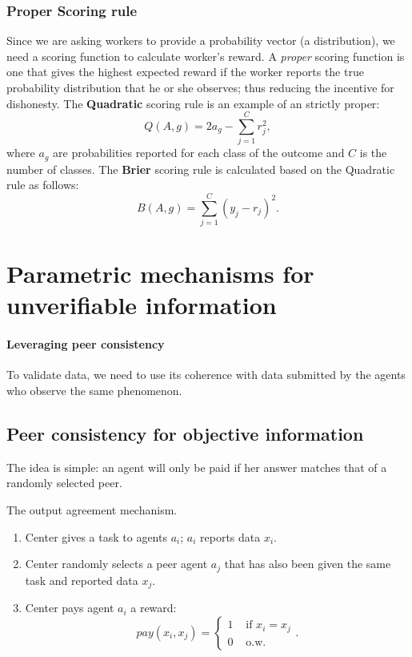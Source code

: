 \documentclass{report}
\theoremstyle{definition}
\begin{document}
\subsubsection{Proper Scoring rule}
Since we are asking workers to provide a probability vector (a distribution), we need a scoring function to calculate worker's reward. A \emph{proper} scoring function is one that gives the highest expected reward if the worker reports the true probability distribution that he or she observes; thus reducing the incentive for dishonesty. The \textbf{Quadratic} scoring rule is an example of an strictly proper:
\begin{equation}
    Q(A, g) = 2a_g - \sum^C_{j=1} {r_j^2}, 
\end{equation}
where $a_g$ are probabilities reported for each class of the outcome and $C$ is the number of classes. The \textbf{Brier} scoring rule is calculated based on the Quadratic rule as follows:
\begin{equation}
    B(A, g) = \sum_{j=1}^C (y_j -r_j)^2.
\end{equation}

\section{Parametric mechanisms for unverifiable information}

\paragraph{Leveraging peer consistency}
To validate data, we need to use its coherence with data submitted by the agents who observe the same phenomenon.

\subsection{Peer consistency for objective information}
The idea is simple: an agent will only be paid if her answer matches that of a randomly selected peer.

\begin{algorithm}
    \caption{The output agreement mechanism.}
    \label{alg:output_agreement}
    \begin{enumerate}
        \item Center gives a task to agents $a_i$; $a_i$ reports data $x_i$.
        \item Center randomly selects a peer agent $a_j$ that has also been given the same task and reported data $x_j$.
        
        \item{Center pays agent $a_i$ a reward:
        \begin{equation*}
            pay(x_i, x_j)= \begin{cases}
                 1 &\text{ if } x_i = x_j\\
                 0 &\text{ o.w.}
            \end{cases}.
        \end{equation*}}
    \end{enumerate}
\end{algorithm}
\end{document}
